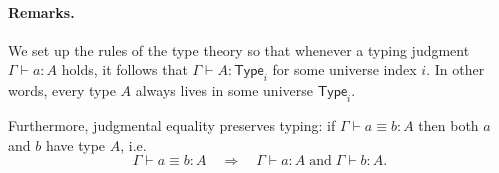 \documentclass{article}
\newcommand{\Type}{\ensuremath{\mathsf{Type}}}
\newcommand{\judg}[3]{#1 \vdash #2 : #3}   %
\newcommand{\jdeq}{\equiv}                 %
\newcommand{\teq}[4]{#1 \vdash #2 \jdeq #3 : #4} %
\newcommand{\rulename}[1]{\textsc{#1}}
\begin{document}
\paragraph{Remarks.}
We set up the rules of the type theory so that whenever a typing judgment
\(\judg{\Gamma}{a}{A}\) holds, it follows that \(\judg{\Gamma}{A}{\Type_i}\)
for some universe index \(i\).  
In other words, every type \(A\) always lives in some universe \(\Type_i\).

Furthermore, judgmental equality preserves typing:  
if \(\teq{\Gamma}{a}{b}{A}\) then both \(a\) and \(b\) have type \(A\), i.e.
\[
\teq{\Gamma}{a}{b}{A} \quad\Rightarrow\quad
\judg{\Gamma}{a}{A} \;\text{and}\; \judg{\Gamma}{b}{A}.
\]






\end{document}
